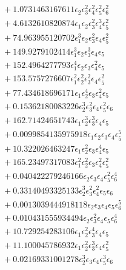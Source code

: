 \documentclass[10pt]{article}
\begin{document}
\begin{align*}
&{}  + 1.0731463167611 \epsilon_{2} \epsilon_{3}^{2} \epsilon_{4}^{2} \epsilon_{5}^{2} \epsilon_{6}^{2} \\
&{}  + 4.6132610820874 \epsilon_{1} \epsilon_{2} \epsilon_{3}^{2} \epsilon_{4}^{3} \epsilon_{5}^{2} \\
&{}  + 74.963955120702 \epsilon_{1}^{3} \epsilon_{2} \epsilon_{3}^{2} \epsilon_{4} \epsilon_{5}^{2} \\
&{}  + 149.9279102414 \epsilon_{1}^{3} \epsilon_{2} \epsilon_{3}^{3} \epsilon_{4} \epsilon_{5} \\
&{}  + 152.4964277793 \epsilon_{1}^{4} \epsilon_{2} \epsilon_{3} \epsilon_{4}^{2} \epsilon_{5} \\
&{}  + 153.5757276607 \epsilon_{1}^{2} \epsilon_{2}^{2} \epsilon_{3}^{2} \epsilon_{4} \epsilon_{5}^{2} \\
&{}  + 77.434618696171 \epsilon_{1} \epsilon_{2}^{4} \epsilon_{3} \epsilon_{4}^{2} \epsilon_{5} \\
&{}  + 0.15362180083226 \epsilon_{2}^{3} \epsilon_{3}^{2} \epsilon_{4} \epsilon_{5}^{2} \epsilon_{6} \\
&{}  + 162.71424651743 \epsilon_{1} \epsilon_{2}^{3} \epsilon_{3}^{3} \epsilon_{4} \epsilon_{5} \\
&{}  + 0.0099854135975918 \epsilon_{1} \epsilon_{2} \epsilon_{3} \epsilon_{4} \epsilon_{5}^{5} \\
&{}  + 10.322026463247 \epsilon_{1} \epsilon_{2}^{2} \epsilon_{3} \epsilon_{4}^{4} \epsilon_{5} \\
&{}  + 165.23497317083 \epsilon_{1}^{2} \epsilon_{2}^{2} \epsilon_{3} \epsilon_{4}^{2} \epsilon_{5}^{2} \\
&{}  + 0.040422279246166 \epsilon_{2} \epsilon_{3} \epsilon_{4} \epsilon_{5}^{2} \epsilon_{6}^{4} \\
&{}  + 0.33140493325133 \epsilon_{2}^{3} \epsilon_{3}^{2} \epsilon_{4}^{2} \epsilon_{5} \epsilon_{6} \\
&{}  + 0.0013039444918118 \epsilon_{2} \epsilon_{3} \epsilon_{4} \epsilon_{5} \epsilon_{6}^{5} \\
&{}  + 0.010431555934494 \epsilon_{2} \epsilon_{3}^{2} \epsilon_{4} \epsilon_{5} \epsilon_{6}^{4} \\
&{}  + 10.729254283106 \epsilon_{1} \epsilon_{2}^{2} \epsilon_{3}^{4} \epsilon_{4} \epsilon_{5} \\
&{}  + 11.100045786932 \epsilon_{1} \epsilon_{2}^{2} \epsilon_{3}^{3} \epsilon_{4} \epsilon_{5}^{2} \\
&{}  + 0.02169331001278 \epsilon_{2}^{3} \epsilon_{3} \epsilon_{4} \epsilon_{5}^{3} \epsilon_{6} \\

\end{align*}
\end{document}

